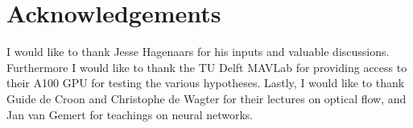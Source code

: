 \documentclass{article}
\begin{document}
\section*{Acknowledgements}
I would like to thank Jesse Hagenaars for his inputs and valuable discussions. Furthermore I would like to thank the TU Delft MAVLab for providing access to their A100 GPU for testing the various hypotheses. Lastly, I would like to thank Guide de Croon and Christophe de Wagter for their lectures on optical flow, and Jan van Gemert for teachings on neural networks. 




%
\end{document}
